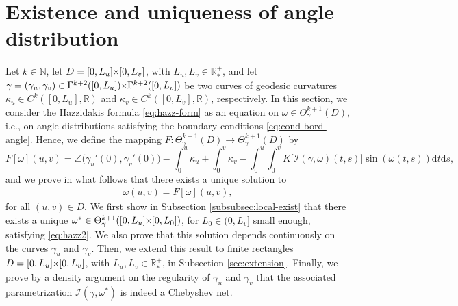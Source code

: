 \documentclass{article}
\newcommand{\I}{\mathcal{I}}
\newcommand{\PLH}{{\mkern-1mu\times\mkern-1mu}}
\newcommand{\Times}{\PLH}
\newcommand{\R}{\mathbb{R}}
\newcommand{\EN}{\mathbb{N}}
\newcommand{\ko}{\kappa}
\newcommand{\ds}{\mathrm{d}s}
\newcommand{\dt}{\mathrm{d}t}
\theoremstyle{remark}
\theoremstyle{prpart}
\begin{document}
\section{Existence and uniqueness of angle distribution}\label{subsec:exist-pt-fixe}
Let $k\in\EN$, let $D=[0,L_u]\Times[0,L_v]$, with $L_u,L_v\in\R^+_\ast$, and let $\gamma=(\gamma_u,\gamma_v)\in\Gamma^{k+2}([0,L_u])\Times\Gamma^{k+2}([0,L_v])$ be two curves of geodesic curvatures $\ko_u\in C^k([0,L_u],\R)$ and $\ko_v\in C^k([0,L_v],\R)$, respectively. In this section, we consider the Hazzidakis formula \eqref{eq:hazz-form} as an equation on $\omega\in\Theta^{k+1}_{\gamma}(D)$, i.e., on angle distributions satisfying the boundary conditions \eqref{eq:cond-bord-angle}. Hence, we define the mapping $F:\Theta_\gamma^{k+1}(D)\to\Theta^{k+1}_{\gamma}(D)$ by 
\begin{equation*} 
    F[\omega](u,v) = \angle\big(\gamma_u'(0),\gamma_v'(0)\big) - \int_0^u\ko_u + \int_{0}^v\ko_v -\int_{0}^{u} \int_{0}^{v} K\big[\I(\gamma,\omega)(t,s)\big]\sin(\omega(t,s)) \dt \ds,
\end{equation*}
and we prove in what follows that there exists a unique solution to 
\begin{equation} \label{eq:hazz2}
  \begin{split}
    \omega(u,v) = F[\omega](u,v),
    \end{split}
\end{equation}
for all $(u,v)\in D$. We first show in Subsection \ref{subsubsec:local-exist} that there exists a unique \sloppy$\omega^\ast\in \Theta^{k+1}_{\gamma}([0,L_u]\Times[0,L_0])$, for $L_0\in(0,L_v]$ small enough, satisfying \eqref{eq:hazz2}. We also prove that this solution depends continuously on the curves $\gamma_u$ and $\gamma_v$. Then, we extend this result to finite rectangles $D=[0,L_u]\Times[0,L_v]$, with $L_u,L_v\in\R_\ast^+$, in Subsection \ref{sec:extension}. 
Finally, we prove by a density argument on the regularity of $\gamma_u$ and $\gamma_v$ that the associated parametrization $\I(\gamma,\omega^\ast)$ is indeed a Chebyshev net. 
\end{document}
